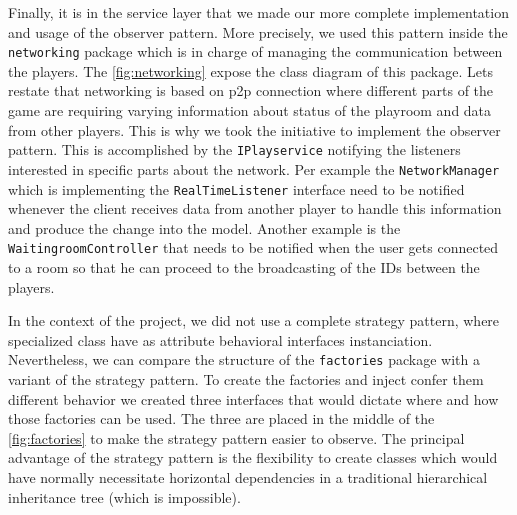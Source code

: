 Finally, it is in the service layer that we made our more complete implementation and usage of the observer pattern. More precisely, we used this pattern inside the \texttt{networking} package which is in charge of managing the communication between the players. The \autoref{fig:networking} expose the class diagram of this package. Lets restate that networking is based on \gls{p2p} connection where different parts of the game are requiring varying information about status of the playroom and data from other players. This is why we took the initiative to implement the observer pattern. This is accomplished by the \texttt{IPlayservice} notifying the listeners interested in specific parts about the network. Per example the \texttt{NetworkManager} which is implementing the \texttt{RealTimeListener} interface need to be notified whenever the client receives data from another player to handle this information and produce the change into the model. Another example is the \texttt{WaitingroomController} that needs to be notified when the user gets connected to a room so that he can proceed to the broadcasting of the IDs between the players.


In the context of the project, we did not use a complete strategy pattern, where specialized class have as attribute behavioral interfaces instanciation. Nevertheless, we can compare the structure of the \texttt{factories} package with a variant of the strategy pattern. To create the factories and inject confer them different behavior we created three interfaces that would dictate where and how those factories can be used.
The three are placed in the middle of the \autoref{fig:factories} to make the strategy pattern easier to observe. The principal advantage of the strategy pattern is the flexibility to create classes which would have normally necessitate horizontal dependencies in a traditional hierarchical inheritance tree (which is impossible).


